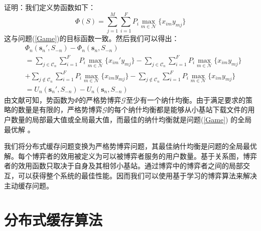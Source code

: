 \documentclass[bachelor]{seuthesis} %
\begin{document}
\begin{Main}
证明：我们定义势函数如下：
\begin{equation}
\Phi(S)=\sum_{j=1}^M\sum_{i=1}^FP_i\max_{m\in\mathcal{N}}\{x_{im}y_{mj}\}
\end{equation}
这与问题(\ref{Game})的目标函数一致。然后我们可以得出：
\begin{equation}
\begin{split}
&\Phi_n(\textbf{s}_n',S_{-n})-\Phi_n(\textbf{s}_n,S_{-n})\\
&=\sum_{j\in\mathcal{C}_n}\sum_{i=1}^FP_i\max_{m\in\mathcal{N}}\{x_{im}'y_{mj}\}-\sum_{j\in\mathcal{C}_n}\sum_{i=1}^FP_i\max_{m\in\mathcal{N}}\{x_{im}y_{mj}\}\\
&+\sum_{j\notin\mathcal{C}_n}\sum_{i=1}^FP_i\max_{m\in\mathcal{N}}\{x_{im}y_{mj}\}-\sum_{j\notin\mathcal{C}_n}\sum_{i=1}^FP_i\max_{m\in\mathcal{N}}\{x_{im}y_{mj}\}\\
&=U_n(\textbf{s}_n',S_{-n})-U_n(\textbf{s}_n,S_{-n})
\end{split}
\end{equation}
由文献\cite{monderer1996potential}可知，势函数为$\Phi$的严格势博弈$\mathcal{G}$至少有一个纳什均衡。由于满足要求的策略的数量是有限的，严格势博弈$\mathcal{G}$的每个纳什均衡都是能够从小基站下载文件的用户数量的局部最大值或全局最大值，而最佳的纳什均衡就是问题(\ref{Game}) 的全局最优解
\cite{zheng2015optimal}\cite{xu2012opportunistic}\cite{song2011optimal}。\par
我们将分布式缓存问题变换为严格势博弈问题，其最佳纳什均衡是问题的全局最优解。每个博弈者的效用被定义为可以被博弈者服务的用户数量。基于关系图，博弈者的效用函数只取决于自身及其相邻小基站。通过博弈中的博弈者之间的局部交互，可以获得整个系统的最佳性能。因而我们可以使用基于学习的博弈算法来解决主动缓存问题。
\section{分布式缓存算法}

\end{Main}
\end{document}
